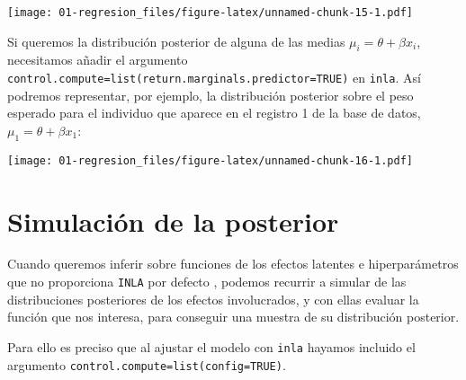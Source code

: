 \documentclass[
]{book}
\newenvironment{Shaded}{\begin{snugshade}}{\end{snugshade}}
\newcommand{\AttributeTok}[1]{\textcolor[rgb]{0.77,0.63,0.00}{#1}}
\newcommand{\ConstantTok}[1]{\textcolor[rgb]{0.00,0.00,0.00}{#1}}
\newcommand{\DecValTok}[1]{\textcolor[rgb]{0.00,0.00,0.81}{#1}}
\newcommand{\FunctionTok}[1]{\textcolor[rgb]{0.00,0.00,0.00}{#1}}
\newcommand{\NormalTok}[1]{#1}
\newcommand{\OtherTok}[1]{\textcolor[rgb]{0.56,0.35,0.01}{#1}}
\newcommand{\SpecialCharTok}[1]{\textcolor[rgb]{0.00,0.00,0.00}{#1}}
\newcommand{\StringTok}[1]{\textcolor[rgb]{0.31,0.60,0.02}{#1}}
\begin{document}
\texttt{[image: 01-regresion\_files/figure-latex/unnamed-chunk-15-1.pdf]}

Si queremos la distribución posterior de alguna de las medias \(\mu_i=\theta+ \beta x_i\), necesitamos añadir el argumento \texttt{control.compute=list(return.marginals.predictor=TRUE)} en \texttt{inla}. Así podremos representar, por ejemplo, la distribución posterior sobre el peso esperado para el individuo que aparece en el registro 1 de la base de datos, \(\mu_1=\theta+\beta x_1\):

\begin{Shaded}
\end{Shaded}

\texttt{[image: 01-regresion\_files/figure-latex/unnamed-chunk-16-1.pdf]}

\hypertarget{simulaciuxf3n-de-la-posterior}{%
\section{Simulación de la posterior}\label{simulaciuxf3n-de-la-posterior}}

Cuando queremos inferir sobre funciones de los efectos latentes e hiperparámetros que no proporciona \texttt{INLA} por defecto , podemos recurrir a simular de las distribuciones posteriores de los efectos involucrados, y con ellas evaluar la función que nos interesa, para conseguir una muestra de su distribución posterior.

Para ello es preciso que al ajustar el modelo con \texttt{inla} hayamos incluido el argumento \texttt{control.compute=list(config=TRUE)}.
\end{document}
